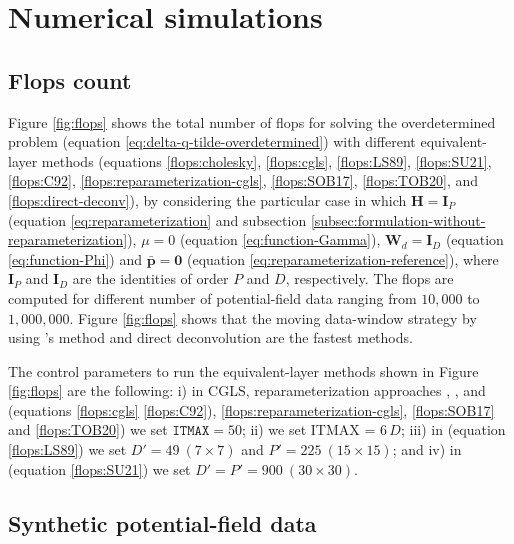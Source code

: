 \section{Numerical simulations}
\label{sec:numerical-simulations}

\subsection{Flops count}
\label{subsec:flops-count}

Figure \ref{fig:flops} shows the total number of flops for solving the overdetermined problem
(equation \ref{eq:delta-q-tilde-overdetermined}) with different equivalent-layer methods
(equations \ref{flops:cholesky}, \ref{flops:cgls}, \ref{flops:LS89}, \ref{flops:SU21}, 
\ref{flops:C92}, \ref{flops:reparameterization-cgls}, \ref{flops:SOB17}, \ref{flops:TOB20},
and \ref{flops:direct-deconv}), by considering 
the particular case in which $\mathbf{H} = \mathbf{I}_{P}$ (equation \ref{eq:reparameterization} and 
subsection \ref{subsec:formulation-without-reparameterization}),
$\mu = 0$ (equation \ref{eq:function-Gamma}), 
$\mathbf{W}_{d} = \mathbf{I}_{D}$ (equation \ref{eq:function-Phi}) and
$\bar{\mathbf{p}} = \mathbf{0}$ (equation \ref{eq:reparameterization-reference}), 
where $\mathbf{I}_{P}$ and $\mathbf{I}_{D}$ are the identities of order $P$ and $D$, respectively.
The flops are computed for different number of potential-field data ranging from $10,000$ to $1,000,000$.
Figure \ref{fig:flops} shows that the moving data-window strategy by using 
\citeauthor{leao-silva1989}'s \citeyear{leao-silva1989} method and direct deconvolution are the fastest methods.

The control parameters to run the equivalent-layer methods shown in Figure 
 \ref{fig:flops}  are the following: 
i) in CGLS, reparameterization approaches \cite[e.g.,][]{oliveirajr-etal2013, mendonca2020}, \cite{siqueira-etal2017}, and 
\cite{takahashi-etal2020} (equations \ref{flops:cgls} \ref{flops:C92}), 
\ref{flops:reparameterization-cgls},  \ref{flops:SOB17} and \ref{flops:TOB20}) we set $\mathtt{ITMAX} = 50$; 
ii) \cite{cordell1992} we set ITMAX = $6 \, D$; 
iii) in \cite{leao-silva1989} (equation \ref{flops:LS89}) we set 
$D'= 49 \: (7 \times 7)$ and $P' = 225 \: (15 \times 15) $; and
iv) in \cite{soler-uieda2021} (equation  \ref{flops:SU21}) we set 
$D'= P' = 900 \: (30 \times 30)$.

\subsection{Synthetic potential-field data}
\label{subsec:synthetic-data}

